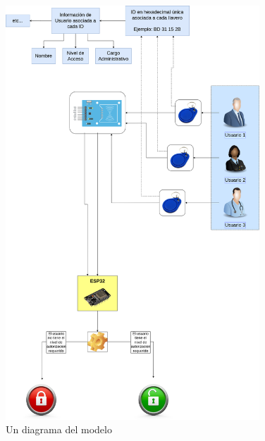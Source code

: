 \documentclass{article}
\begin{document}
\begin{figure}[H]
	\includegraphics[width=0.85\textwidth]{diagrama.drawio.png}
	\centering
	\caption{Un diagrama del modelo}
\end{figure}
\end{document}

